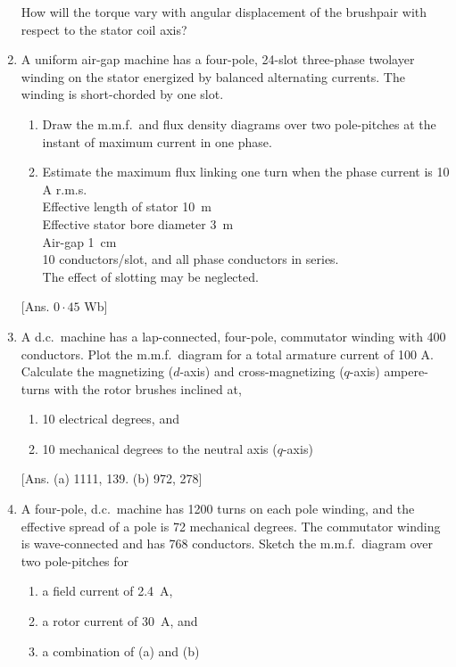 \documentclass[a4paper,numbers=noenddot,12pt]{scrbook}
\begin{document}
\begin{enumerate}[label={\thechapter.\arabic*},leftmargin=*]
        How will the torque vary with angular displacement of the brush­pair with respect to the stator coil axis?
    \item A uniform air-gap machine has a four-pole, 24-slot three-phase two­layer winding on the stator energized by balanced alternating currents. The winding is short-chorded by one slot.
        \begin{enumerate}
            \item Draw the m.m.f.\ and flux density diagrams over two pole-pitches at the instant of maximum current in one phase.
            \item Estimate the maximum flux linking one turn when the phase current is 10 A r.m.s.\\
                Effective length of stator \SI{10}{\meter}\\
                Effective stator bore diameter \SI{3}{\meter}\\
                Air-gap \SI{1}{\centi\meter}\\
                10 conductors/slot, and all phase conductors in series.\\
                The effect of slotting may be neglected.
        \end{enumerate}
        [Ans. $0\cdot45$ Wb]
    \item A d.c.\ machine has a lap-connected, four-pole, commutator winding with 400 conductors. Plot the m.m.f.\ diagram for a total armature current of 100 A.
        Calculate the magnetizing ($d$-axis) and cross-magnetizing ($q$-axis) ampere-turns with the rotor brushes inclined at,
        \begin{enumerate}
            \item 10 electrical degrees, and
            \item 10 mechanical degrees to the neutral axis ($q$-axis)
        \end{enumerate}
        [Ans. (a) 1111, 139. (b) 972, 278]
    \item A four-pole, d.c.\ machine has 1200 turns on each pole winding, and the effective spread of a pole is 72 mechanical degrees. The commutator winding is wave-connected and has 768 conductors.
        Sketch the m.m.f.\ diagram over two pole-pitches for
        \begin{enumerate}
            \item a field current of \SI{2.4}{\ampere},
            \item a rotor current of \SI{30}{\ampere}, and
            \item a combination of (a) and (b)

\end{enumerate}
\end{enumerate}
\end{document}
